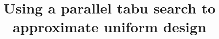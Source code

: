 \documentclass[a4paper,10pt]{llncs}
\title{Using a parallel tabu search to approximate uniform design}
\author{}
\begin{document}
\maketitle

\begin{abstract}

\end{abstract}

\section{}
\end{document}

